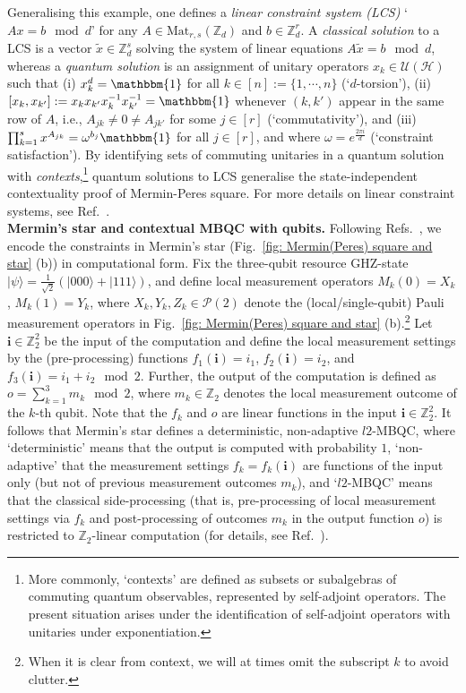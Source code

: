 \documentclass[aps,pra,letterpaper,onrcolumn,nofootinbib,notitlepage,longbibliography]{revtex4-1}
\newcommand{\one}{\mathbbm{1}}
\newcommand{\UH}{\mc{U}(\cH)}
\newcommand{\zz}{\mathbb Z}
\newcommand\mc[1]{\mathcal{#1}}
\newcommand{\cH}{\mc{H}}
\newcommand{\cP}{\mc{P}}
\begin{document}
Generalising this example, one defines a \emph{linear constraint system (LCS)} `$Ax=b \mod d$' for any $A\in\mathrm{Mat}_{r,s}(\zz_d)$ and $b\in\zz^r_d$. A \emph{classical solution} to a LCS is a vector $\tilde{x}\in\zz_d^s$ solving the system of linear equations $A\tilde{x}=b\mod d$, whereas a \emph{quantum solution} is an assignment of unitary operators $x_k\in\UH$ such that (i) $x_k^d=\one$ for all $k\in [n]:=\{1,\cdots,n\}$ (`$d$-torsion'), (ii) $[x_k,x_{k'}] := x_kx_{k'}x_k^{-1}x_{k'}^{-1} = \one$ whenever $(k,k')$ appear in the same row of $A$, i.e., $A_{jk}\neq0\neq A_{jk'}$ for some $j\in[r]$ (`commutativity'), and (iii) $\prod_{k=1}^s x^{A_{jk}}=\omega^{b_j}\one$ for all $j\in [r]$, and where $\omega=e^{\frac{2\pi i}{d}}$ (`constraint satisfaction'). By identifying sets of commuting unitaries in a quantum solution with \emph{contexts},\footnote{More commonly, `contexts' are defined as subsets or subalgebras of commuting quantum observables, represented by self-adjoint operators. The present situation arises under the identification of self-adjoint operators with unitaries under exponentiation.} quantum solutions to LCS generalise the state-independent contextuality proof of Mermin-Peres square. For more details on linear constraint systems, see Ref.~\cite{Arkhipov2012,CleveMittal2014,CleveLiuSlofstra2017,Slofstra2019,QassimWallman2020,FrembsChungOkay2022}.\\


\textbf{Mermin's star and contextual MBQC with qubits.} Following Refs.~\cite{AndersBrowne2009,Raussendorf2013}, we encode the constraints in Mermin's star (Fig.~\ref{fig: Mermin(Peres) square and star} (b)) in computational form. Fix the three-qubit resource GHZ-state $|\psi\rangle=\frac{1}{\sqrt{2}}(|000\rangle+|111\rangle)$, and define local measurement operators $M_k(0)=X_k$, $M_k(1)=Y_k$, where $X_k,Y_k,Z_k\in \cP(2)$ denote the (local/single-qubit) Pauli measurement operators in Fig.~\ref{fig: Mermin(Peres) square and star} (b).\footnote{When it is clear from context, we will at times omit the subscript $k$ to avoid clutter.} Let $\mathbf{i} \in \zz_2^2$ be the input of the computation and define the local measurement settings by the (pre-processing) functions $f_1(\mathbf{i})=i_1$, $ f_2(\mathbf{i})=i_2$, and $f_3(\mathbf{i})=i_1+i_2\mod 2$. Further, the output of the computation is defined as $o=\sum_{k=1}^3 m_k\mod 2$, where $m_k\in\zz_2$ denotes the local measurement outcome of the $k$-th qubit. Note that the $f_k$ and $o$ are linear functions in the input $\mathbf{i}\in\zz_2^2$. It follows that Mermin's star defines a deterministic, non-adaptive $l2$-MBQC, where `deterministic' means that the output is computed with probability $1$, `non-adaptive' that the measurement settings $f_k=f_k(\mathbf{i})$ are functions of the input only (but not of previous measurement outcomes $m_k$), and `$l2$-MBQC' means that the classical side-processing (that is, pre-processing of local measurement settings via $f_k$ and post-processing of outcomes $m_k$ in the output function $o$) is restricted to $\zz_2$-linear computation (for details, see Ref.~\cite{HobanCampbell2011, Raussendorf2013,FrembsRobertsCampbellBartlett2022}).
\end{document}
